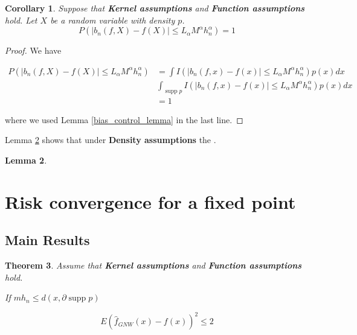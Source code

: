 \documentclass{article}
\newtheorem{theorem}{Theorem}[section]
\newtheorem{lemma}[theorem]{Lemma}
\newtheorem{corollary}[theorem]{Corollary}
\DeclareMathOperator\supp{supp}
\begin{document}
\begin{corollary} Suppose that \textbf{Kernel assumptions} and \textbf{Function assumptions} hold. Let $X$ be a random variable with density $p$. 
\begin{equation*} 
P(|b_n(f,X)-f(X)|\leq L_{\alpha}M^{\alpha}h_n^{\alpha})=1
\end{equation*}

\end{corollary}
\begin{proof}
We have

\begin{equation*}
\begin{split}
    P(|b_n(f,X)-f(X)|\leq L_{\alpha}M^{\alpha}h_n^{\alpha})&=\int I(|b_n(f,x)-f(x)|\leq L_{\alpha}M^{\alpha}h_n^{\alpha})p(x)dx\\
    &\int_{\supp{p}} I(|b_n(f,x)-f(x)|\leq L_{\alpha}M^{\alpha}h_n^{\alpha})p(x)dx\\
    &=1
\end{split}
\end{equation*}

where we used Lemma \ref{bias_control_lemma} in the last line.

\end{proof}

Lemma \ref{density_lemma} shows that under \textbf{Density assumptions} the .

\begin{lemma}
\label{density_lemma}
\end{lemma}

\section{Risk convergence for a fixed point}


\subsection{Main Results}



\begin{theorem} Assume that \textbf{Kernel assumptions} and \textbf{Function assumptions} hold.

If $mh_n\leq d(x,\partial\supp{p}) $


\begin{equation*}
    E(\hat{f}_{GNW}(x)-f(x))^2\leq 2
\end{equation*}

\end{theorem}
\end{document}
